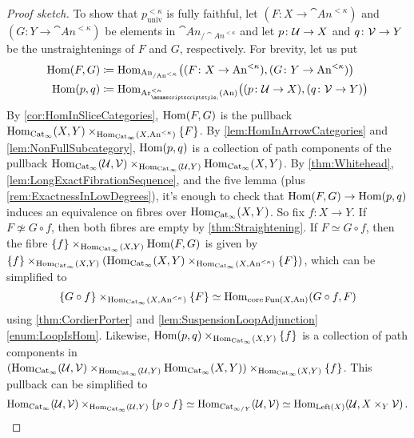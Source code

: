 \begin{proof}[Proof sketch]
	To show that $p_\mathrm{univ}^{<\kappa}$ is fully faithful, let $(F\colon X\rightarrow \cat{An}^{<\kappa})$ and $(G\colon Y\rightarrow \cat{An}^{<\kappa})$ be elements in $\cat{An}_{/\cat{An}^{<\kappa}}$ and let $p\colon \mathcal{U}\rightarrow X$ and $q\colon \mathcal{V}\rightarrow Y$ be the unstraightenings of $F$ and $G$, respectively. For brevity, let us put
	\begin{align*}
		\Hom(F,G)&\coloneqq \Hom_{\cat{An}_{/\cat{An}^{<\kappa}}}\left((F\colon X\rightarrow \cat{An}^{<\kappa}),(G\colon Y\rightarrow \cat{An}^{<\kappa})\right)\\
		\Hom(p,q)&\coloneqq \Hom_{\Ar_{ \pullbacksign \vphantom{^n} }^{<\kappa}(\cat{An})}\bigl((p\colon \Uu\rightarrow X),(q\colon \Vv\rightarrow Y)\bigr)
	\end{align*}
	By \cref{cor:HomInSliceCategories}, $\operatorname{Hom}(F,G)$ is the pullback $\Hom_{\cat{Cat}_\infty}\left(X,Y\right)\times_{\Hom_{\cat{Cat}_\infty}(X,\cat{An}^{<\kappa})}\{F\}$. By \cref{lem:HomInArrowCategories} and \cref{lem:NonFullSubcategory}, $\operatorname{Hom}(p,q)$ is a collection of path components of the pullback $\Hom_{\cat{Cat}_\infty}\left(\Uu,\Vv\right)\times_{\Hom_{\cat{Cat}_\infty}(\Uu,Y)}\Hom_{\cat{Cat}_\infty}\left(X,Y\right)$. By \cref{thm:Whitehead}, \cref{lem:LongExactFibrationSequence}, and the five lemma (plus \cref{rem:ExactnessInLowDegrees}), it's enough to check that $\operatorname{Hom}(F,G)\rightarrow \operatorname{Hom}(p,q)$ induces an equivalence on fibres over $\operatorname{Hom}_{\mathrm{Cat}_\infty}(X,Y)$. So fix $f\colon X\rightarrow Y$. If $F\not\simeq G\circ f$, then both fibres are empty by \cref{thm:Straightening}. If $F\simeq G\circ f$, then the fibre $\{f\}\times_{\Hom_{\cat{Cat}_\infty}(X,Y)}\Hom\left(F,G\right)$ is given by $\{f\}\times_{\Hom_{\cat{Cat}_\infty}(X,Y)}\left(\Hom_{\cat{Cat}_\infty}(X,Y\right)\times_{\Hom_{\cat{Cat}_\infty}(X,\cat{An}^{<\kappa})}\{F\})$, which can be simplified to
	\begin{equation*}
		\{G\circ f\}\times_{\Hom_{\cat{Cat}_\infty}(X,\cat{An}^{<\kappa})}\{F\}\simeq \Hom_{\core \Fun(X,\cat{An})}\left(G\circ f,F\right)
	\end{equation*}
	using \cref{thm:CordierPorter} and \cref{lem:SuspensionLoopAdjunction}\cref{enum:LoopIsHom}. Likewise, $\operatorname{Hom}(p,q)\times_{\operatorname{Hom}_{\mathrm{Cat}_\infty}(X,Y)}\{f\}$ is a collection of path components in $(\Hom_{\cat{Cat}_\infty}\left(\Uu,\Vv\right)\times_{\Hom_{\cat{Cat}_\infty}(\Uu,Y)}\Hom_{\cat{Cat}_\infty}\left(X,Y\right))\times_{\Hom_{\cat{Cat}_\infty}(X,Y)}\{f\}$. This pullback can be simplified to
	\begin{equation*}
		\Hom_{\cat{Cat}_\infty}\left(\Uu,\Vv\right)\times_{\Hom_{\cat{Cat}_\infty}(\Uu,Y)}\{p\circ f\}\simeq \Hom_{\cat{Cat}_{\infty/Y}}\left(\Uu,\Vv\right)\simeq \Hom_{\cat{Left}(X)}\left(\Uu,X\times_Y\Vv\right)\,.

\end{equation*}
\end{proof}
